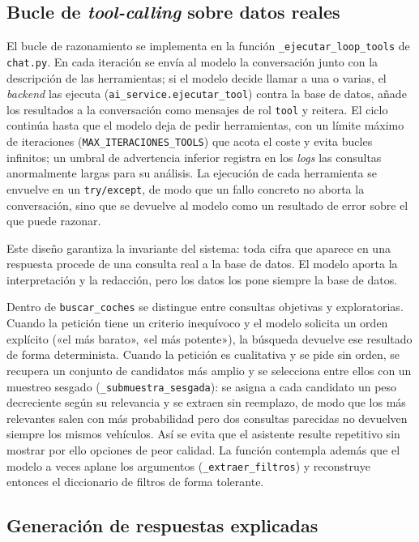 \subsection{Bucle de \textit{tool-calling} sobre datos reales}
\label{sec:impl-ia-loop}

El bucle de razonamiento se implementa en la función
\texttt{\_ejecutar\_loop\_tools} de \texttt{chat.py}. En cada iteración se envía al
modelo la conversación junto con la descripción de las herramientas; si el modelo
decide llamar a una o varias, el \emph{backend} las ejecuta
(\texttt{ai\_service.ejecutar\_tool}) contra la base de datos, añade los resultados
a la conversación como mensajes de rol \texttt{tool} y reitera. El ciclo continúa
hasta que el modelo deja de pedir herramientas, con un límite máximo de iteraciones
(\texttt{MAX\_ITERACIONES\_TOOLS}) que acota el coste y evita bucles infinitos; un
umbral de advertencia inferior registra en los \emph{logs} las consultas
anormalmente largas para su análisis. La ejecución de cada herramienta se envuelve
en un \texttt{try/except}, de modo que un fallo concreto no aborta la conversación,
sino que se devuelve al modelo como un resultado de error sobre el que puede
razonar.

Este diseño garantiza la invariante del sistema: toda cifra que aparece en una
respuesta procede de una consulta real a la base de datos. El modelo aporta la
interpretación y la redacción, pero los datos los pone siempre la base de datos.

Dentro de \texttt{buscar\_coches} se distingue entre consultas objetivas y
exploratorias. Cuando la petición tiene un criterio inequívoco y el modelo
solicita un orden explícito («el más barato», «el más potente»), la búsqueda
devuelve ese resultado de forma determinista. Cuando la petición es cualitativa y
se pide sin orden, se recupera un conjunto de candidatos más amplio y se selecciona
entre ellos con un muestreo sesgado (\texttt{\_submuestra\_sesgada}): se asigna a
cada candidato un peso decreciente según su relevancia y se extraen sin reemplazo,
de modo que los más relevantes salen con más probabilidad pero dos consultas
parecidas no devuelven siempre los mismos vehículos. Así se evita que el asistente
resulte repetitivo sin mostrar por ello opciones de peor calidad. La función
contempla además que el modelo a veces aplane los argumentos
(\texttt{\_extraer\_filtros}) y reconstruye entonces el diccionario de filtros de
forma tolerante.

\subsection{Generación de respuestas explicadas}
\label{sec:impl-ia-respuestas}


